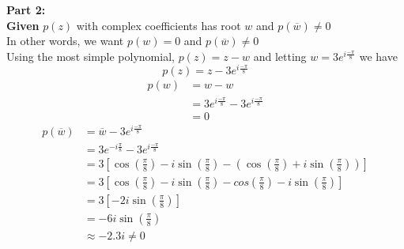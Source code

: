 \documentclass[a4paper, 8pt]{extarticle}
\begin{document}
\begin{examplebox}[: Determine all solutions to $z^4 = -81i$ and find a polynomial $p(z)$ with complex coefficients with root $w$ and $p(\overline{w}) \neq 0$]
	\textbf{Part 2:} \\
	\textbf{Given} $p(z)$ with complex coefficients has root $w$ and $p(\overline{w}) \neq 0$ \\
	In other words, we want $p(w) = 0$ and $p(\overline{w}) \neq 0$ \\
	Using the most simple polynomial, $p(z) = z - w$ and letting $w = 3e^{i\frac{-\pi}{8}}$ we have
	$$p(z) = z - 3e^{i\frac{-\pi}{8}}$$
	\begin{align*}
		p(w) & = w - w                                       \\
		     & = 3e^{i\frac{-\pi}{8}} - 3e^{i\frac{-\pi}{8}} \\
		     & = 0
	\end{align*}
	\begin{align*}
		p(\overline{w}) & = \overline{w} - 3e^{i\frac{-\pi}{8}}                                                                                                                            \\
		                & = 3e^{-i\frac{\pi}{8}} - 3e^{i\frac{-\pi}{8}}                                                                                                                    \\
		                & = 3\left[\cos\left(\frac{\pi}{8}\right) - i\sin\left(\frac{\pi}{8}\right) - \left(\cos\left(\frac{\pi}{8}\right) + i\sin\left(\frac{\pi}{8}\right)\right)\right] \\
		                & = 3\left[\cos\left(\frac{\pi}{8}\right) - i\sin\left(\frac{\pi}{8}\right) - cos\left(\frac{\pi}{8}\right) - i\sin\left(\frac{\pi}{8}\right)\right]               \\
		                & = 3\left[-2i\sin\left(\frac{\pi}{8}\right)\right]                                                                                                                \\
		                & = -6i\sin\left(\frac{\pi}{8}\right)                                                                                                                              \\
		                & \approx -2.3i \neq 0
	\end{align*}
\end{examplebox}
\end{document}
